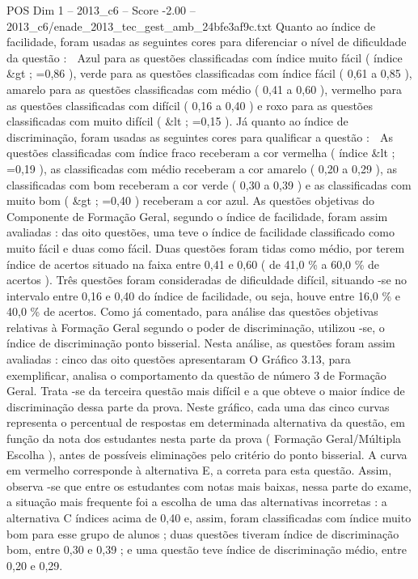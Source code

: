 \begin{textsample}{POS Dim 1 – 2013\_c6 – Score -2.00 – 2013\_c6/enade\_2013\_tec\_gest\_amb\_24bfe3af9c.txt}
Quanto ao índice de facilidade, foram usadas as seguintes cores para diferenciar o nível de dificuldade da questão :  Azul para as questões classificadas com índice muito fácil ( índice \&gt ; =0,86 ), verde para as questões classificadas com índice fácil ( 0,61 a 0,85 ), amarelo para as questões classificadas com médio ( 0,41 a 0,60 ), vermelho para as questões classificadas com difícil ( 0,16 a 0,40 ) e roxo para as questões classificadas com muito difícil ( \&lt ; =0,15 ).
Já quanto ao índice de discriminação, foram usadas as seguintes cores para qualificar a questão :  As questões classificadas com índice fraco receberam a cor vermelha ( índice \&lt ; =0,19 ), as classificadas com médio receberam a cor amarelo ( 0,20 a 0,29 ), as classificadas com bom receberam a cor verde ( 0,30 a 0,39 ) e as classificadas com muito bom ( \&gt ; =0,40 ) receberam a cor azul.
As questões objetivas do Componente de Formação Geral, segundo o índice de facilidade, foram assim avaliadas : das oito questões, uma teve o índice de facilidade classificado como muito fácil e duas como fácil.
Duas questões foram tidas como médio, por terem índice de acertos situado na faixa entre 0,41 e 0,60 ( de 41,0 \% a 60,0 \% de acertos ).
Três questões foram consideradas de dificuldade difícil, situando -se no intervalo entre 0,16 e 0,40 do índice de facilidade, ou seja, houve entre 16,0 \% e 40,0 \% de acertos.
Como já comentado, para análise das questões objetivas relativas à Formação Geral segundo o poder de discriminação, utilizou -se, o índice de discriminação ponto bisserial.
Nesta análise, as questões foram assim avaliadas : cinco das oito questões apresentaram O Gráfico 3.13, para exemplificar, analisa o comportamento da questão de número 3 de Formação Geral.
Trata -se da terceira questão mais difícil e a que obteve o maior índice de discriminação dessa parte da prova.
Neste gráfico, cada uma das cinco curvas representa o percentual de respostas em determinada alternativa da questão, em função da nota dos estudantes nesta parte da prova ( Formação Geral/Múltipla Escolha ), antes de possíveis eliminações pelo critério do ponto bisserial.
A curva em vermelho corresponde à alternativa E, a correta para esta questão.
Assim, observa -se que entre os estudantes com notas mais baixas, nessa parte do exame, a situação mais frequente foi a escolha de uma das alternativas incorretas : a alternativa C índices acima de 0,40 e, assim, foram classificadas com índice muito bom para esse grupo de alunos ; duas questões tiveram índice de discriminação bom, entre 0,30 e 0,39 ; e uma questão teve índice de discriminação médio, entre 0,20 e 0,29.

\end{textsample}
